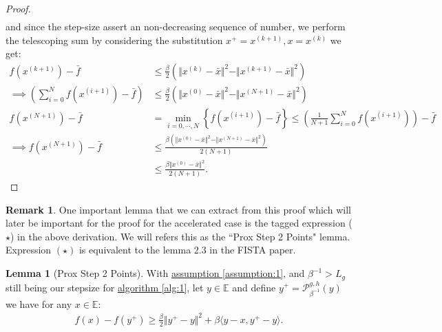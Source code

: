 \documentclass[]{article}
\theoremstyle{definition}
\newtheorem{lemma}{Lemma}[subsection]  %
\newtheorem{remark}{Remark}[subsection]
{
    \newtheorem{assumption}{Assumption}
}
\begin{document}
\begin{proof}
\begin{align*}
            \end{align*}
            and since the step-size assert an non-decreasing sequence of number, we perform the telescoping sum by considering the substitution $x^+ = x^{(k + 1)}, x = x^{(k)}$ we get: 
            \begin{align*}
                f(x^{(k + 1)}) - \bar f 
                &\le
                \frac{\beta}{2}(\Vert x^{(k)} - \bar x\Vert^2 - \Vert x^{(k + 1)} - \bar x\Vert^2)
                \\
                \implies
                \left(
                    \sum_{i = 0}^{N} f(x^{(i + 1)})
                    - \bar f
                \right)
                &\le
                \frac{\beta}{2}
                (\Vert x^{(0)} - \bar x\Vert^2 - \Vert x^{(N + 1)} - \bar x\Vert^2)
                \\
                f(x^{(N + 1)}) - \bar f & = 
                \min_{i = 0, \cdots, N}\left\lbrace
                    f(x^{(i + 1)}) - \bar f
                \right\rbrace \le 
                \left(
                    \frac{1}{N + 1}\sum_{i = 0}^{N}f(x^{(i + 1)})
                \right) - \bar f
                \\
                \implies
                f(x^{(N + 1)}) - \bar f
                &\le  
                \frac{\beta(\Vert x^{(0)} - \bar x\Vert^2 - \Vert x^{(N + 1)} - \bar x\Vert^2)}{2(N + 1)}
                \\
                &\le 
                \frac{\beta \Vert x^{(0)} - \bar x\Vert^2 }{2(N + 1)}. 
            \end{align*}
        \end{proof}
        \begin{remark}
            One important lemma that we can extract from this proof which will later be important for the proof for the accelerated case is the tagged expression ($\star$) in the above derivation. We will refers this as the ``Prox Step 2 Points" lemma. Expression $(\star)$ is equivalent to the lemma 2.3 in the FISTA paper\cite{paper:FISTA}. 
        \end{remark}
        \begin{lemma}[Prox Step 2 Points]\label{lemma:prox_two_p}
            With \hyperref[assumption:1]{assumption \ref*{assumption:1}}, and $\beta^{-1} > L_g$ still being our stepsize for \hyperref[alg:1]{algorithm \ref*{alg:1}}, let $y\in \mathbb E$ and define $y^+ = \mathcal P_{\beta^{-1}}^{g, h}(y)$ we have for any $x\in \mathbb E$: 
            \begin{align*}
                f(x) - f(y^+) \ge \frac{\beta}{2}\Vert y^+ - y\Vert^2 + 
                \beta \langle y - x, y^+ - y\rangle. 
            \end{align*}
        \end{lemma}
\end{document}
